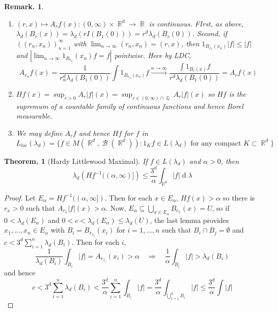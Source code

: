 \documentclass[11pt, a4paper]{memoir}
\DeclareMathOperator{\Q}{{\mathbb{Q}}}
\DeclareMathOperator{\R}{{\mathbb{R}}}
\theoremstyle{change}
\newtheorem{theorem}{Theorem.}[section]
\theoremstyle{plain}
\theoremstyle{nonumberplain}
\newtheorem{remark}{Remark.}
\newtheorem{proof}{Proof}
\DeclareMathOperator{\B}{{\mathcal{B}}}
\renewcommand{\d}[1]{\ensuremath{\operatorname{d}\!{#1}}}
\numberwithin{equation}{section}
\begin{document}
\begin{remark}
    \begin{enumerate}[nl,r]
        \item $(r,x)\mapsto A_rf(x):(0,\infty)\times\R^d\to\R$ is continuous.
            FIrst, as above, $\lambda_d(B_r(x))=\lambda_d(rI(B_1(0)))=r^d\lambda_d(B_r(0))$.
            Second, if $((r_n,x_n))_{n=1}^\infty$ with $\lim_{n\to\infty}(r_n,x_n)=(r,x)$, then $1_{B_{r_n}(x_n)}|f|\leq|f|$ and $|\lim_{n\to\infty}1_{B_{r_n}}(x_n)f=f|$ pointwise.
            Hece by LDC,
            \begin{equation*}
                A_{r_n}f(x)=\frac{1}{r_n^d\lambda_d(B_1(0))}\int 1_{B_{r_n}(x_n)}f\overset{n\to\infty}{\longrightarrow}\frac{\int 1_{B_r(x)}f}{r^d\lambda_d(B_1(0))}=A_rf(x)
            \end{equation*}
        \item $Hf(x)=\sup_{r>0}A_r|f|(x)=\sup_{r\in(0,\infty)\cap\Q} A_r|f|(x)$ so $Hf$ is the supremum of a countable family of continuous functions and hence Borel measurable.
        \item We may define $A_rf$ and hence $Hf$ for $f$ in
            \begin{equation*}
                L_{loc}(\lambda_d)=\{f\in M(\R^d,\B(\R^d)):1_Kf\in L(\lambda_d)\text{ for any compact }K\subset\R^d\}
            \end{equation*}
    \end{enumerate}
\end{remark}
\begin{theorem}[Hardy Littlewood Maximal]
    If $f\in L(\lambda_d)$ and $\alpha>0$, then
    \begin{equation*}
        \lambda_d\left(Hf^{-1}((\alpha,\infty)]\right)\leq\frac{3^d}{\alpha}\int_{\R^d}|f|\d{\lambda}
    \end{equation*}
\end{theorem}
\begin{proof}
    Let $E_\alpha = Hf^{-1}((\alpha,\infty])$.
    Then for each $x\in E_\alpha$, $Hf(x)>\alpha$ so there is $r_x>0$ such that $A_{r_x}|f|(x)>\alpha$.
    Now, $E_\alpha\subseteq\bigcup_{x\in E_\alpha}B_{r_x}(x)=U$, so if $0<\lambda_d(E_\alpha)$ and $0<c<\lambda_d(E_\alpha)\leq\lambda_d(U)$, the last lemma provides $x_1,\ldots,x_n\in E_\alpha$ with $B_i=B_{r_{x_i}}(x_i)$ for $i=1,\ldots,n$ such that $B_i\cap B_j=\emptyset$ and $c<3^d\sum_{i=1}^n\lambda_d(B_i)$.
    Then for each $i$,
    \begin{equation*}
        \frac{1}{\lambda_d(B_i)}\int_{B_i}|f|=A_{r_{x_i}}(x_i)>\alpha\quad\Rightarrow\quad\frac{1}{\alpha}\int_{B_i}|f|>\lambda_d(B_i)
    \end{equation*}
    and hence
    \begin{equation*}
        c<3^d\sum_{i=1}^n \lambda_d(B_i)<\frac{3^d}{\alpha}\sum_{i=1}^n\int_{B_i}|f|=\frac{3^d}{\alpha}\int_{\bigcup_{i=1}^n B_i}|f|\leq\frac{3^d}{\alpha}\int|f|
    \end{equation*}
\end{proof}
\end{document}
